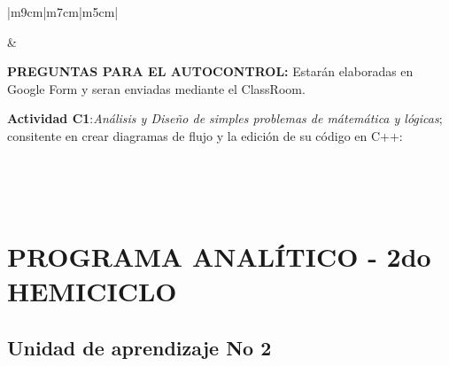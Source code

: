 \documentclass[a4paper,12pt,spanish]{article}
\begin{document}
\begin{tabular}[H]{|m{9cm}|m{7cm}|m{5cm}|}
\begin{minipage}[H]{1.0\linewidth}
{\begin{enumerate}
    \end{enumerate}}
  \vspace{0.2cm}
  \end{minipage}


                     &

  \begin{minipage}[H]{1.0\linewidth}

     \textbf{PREGUNTAS PARA EL AUTOCONTROL:} Estarán elaboradas en Google Form y seran enviadas mediante el ClassRoom.
    \vspace{0.8cm}

     \colorbox{green!30}{\parbox[t]{2in}{ \textbf{Actividad C1}:\textit{Análisis y Diseño de simples problemas de mátemática y  lógicas};  consitente en crear diagramas de flujo y la  edición de su código en C++:}} \\
    
  \end{minipage}

  \\ \hline

\end{tabular}

\newpage
\section{PROGRAMA ANALÍTICO - 2do HEMICICLO}


\subsection{Unidad de aprendizaje No 2}
\label{sec:unid-de-aprend4}
\end{document}
